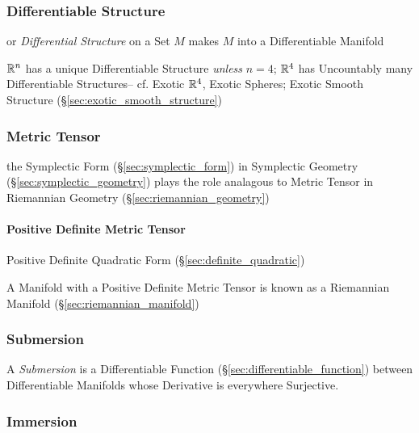 \subsubsection{Differentiable Structure}\label{sec:differentiable_structure}

or \emph{Differential Structure} on a Set $M$ makes $M$ into a Differentiable
Manifold

$\mathbb{R}^n$ has a unique Differentiable Structure \emph{unless} $n = 4$;
$\mathbb{R}^4$ has Uncountably many Differentiable Structures-- cf. Exotic
$\mathbb{R}^4$, Exotic Spheres; Exotic Smooth Structure
(\S\ref{sec:exotic_smooth_structure})



\subsubsection{Metric Tensor}\label{sec:metric_tensor}

the Symplectic Form (\S\ref{sec:symplectic_form}) in Symplectic Geometry
(\S\ref{sec:symplectic_geometry}) plays the role analagous to Metric Tensor in
Riemannian Geometry (\S\ref{sec:riemannian_geometry})



\paragraph{Positive Definite Metric Tensor}
\label{sec:positive_definite_metric_tensor}\hfill

Positive Definite Quadratic Form (\S\ref{sec:definite_quadratic})

A Manifold with a Positive Definite Metric Tensor is known as a
Riemannian Manifold (\S\ref{sec:riemannian_manifold})



\subsubsection{Submersion}\label{sec:submersion}

A \emph{Submersion} is a Differentiable Function
(\S\ref{sec:differentiable_function}) between Differentiable Manifolds
whose Derivative is everywhere Surjective.



\subsubsection{Immersion}\label{sec:immersion}

